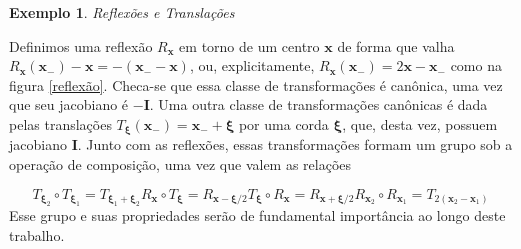 \documentclass[
	12pt,
	oneside,			%
	a4paper,			%
	english,			%
	brazil				%
	]{abntex2}
\theoremstyle{definition}
\newtheorem{exmp}{Exemplo}[chapter]
\begin{document}
\begin{exmp}
\textit{Reflexões e Translações}

Definimos uma reflexão $R_\mathbf{\mathbf{x}}$ em torno de um centro $\mathbf{x}$ de forma que valha $R_{\mathbf{x}}\left( \mathbf{x}_- \right) - \mathbf{x} = - \left( \mathbf{x}_- - \mathbf{x}\right)$, ou, explicitamente, $R_{\mathbf{x}}\left( \mathbf{x}_- \right) = 2 \mathbf{x} - \mathbf{x}_-$ como na figura \ref{reflexão}. Checa-se que essa classe de transformações é canônica, uma vez que seu jacobiano é $-\mathbf{I}$. Uma outra classe de transformações canônicas é dada pelas translações $T_{\boldsymbol{\xi}}\left( \mathbf{x}_- \right) = \mathbf{x}_- + \boldsymbol{\xi}$ por uma corda $\boldsymbol{\xi}$, que, desta vez, possuem jacobiano $\mathbf{I}$. Junto com as reflexões, essas transformações formam um grupo sob a operação de composição, uma vez que valem as relações

\begin{subequations}
\label{reflexões e translações clássicas}
    \begin{equation}
        T_{\boldsymbol{\xi}_2}\circ T_{\boldsymbol{\xi}_1} = T_{\boldsymbol{\xi}_1+\boldsymbol{\xi}_2}
    \end{equation}
    \begin{equation}
         R_\mathbf{x}\circ T_{\boldsymbol{\xi}}=  R_{\mathbf{x}-\boldsymbol{\xi}/2}
    \end{equation}
    \begin{equation}
        T_{\boldsymbol{\xi}}\circ R_\mathbf{x} =  R_{\mathbf{x}+\boldsymbol{\xi}/2}
    \end{equation}
    \begin{equation}
        R_{\mathbf{x}_2} \circ R_{\mathbf{x}_1} =  T_{2(\mathbf{x}_2-\mathbf{x}_1)}
    \end{equation}
\end{subequations}
Esse grupo e suas propriedades serão de fundamental importância ao longo deste trabalho.


\end{exmp}
\end{document}
